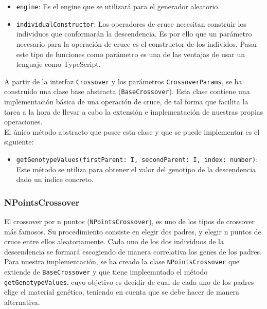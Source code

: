 \begin{itemize}
    \item \texttt{engine}: Es el engine que se utilizará para el generador aleatorio.
    \item \texttt{individualConstructor}: Los operadores de cruce necesitan construir los individuos que conformarán la descendencia. Es por ello que un parámetro necesario para la operación de cruce es el constructor de los individos. Pasar este tipo de funciones como parámetro es una de las ventajas de usar un lenguaje como TypeScript.
\end{itemize}

A partir de la interfaz \texttt{Crossover} y los parámetros \texttt{CrossoverParams}, se ha construido una clase base abstracta (\texttt{BaseCrossover}). Esta clase contiene una implementación básica de una operación de cruce, de tal forma que facilita la tarea a la hora de llevar a cabo la extensión e implementación de nuestras propias operaciones. \\

El único método abstracto que posee esta clase y que se puede implementar es el siguiente:

\begin{itemize}
    \item \texttt{getGenotypeValues(firstParent: I, secondParent: I, index: number)}: Este método se utiliza para obtener el valor del genotipo de la descendencia dado un índice concreto.
\end{itemize}

\subsubsection{NPointsCrossover}

El crossover por n puntos (\texttt{NPointsCrossover}), es uno de los tipos de crossover más famosos. Su procedimiento consiste en elegir dos padres, y elegir n puntos de cruce entre ellos aleatoriamente. Cada uno de los dos individuos de la descendencia se formará escogiendo de manera correlativa los genes de los padres. \\

Para nuestra implementación, se ha creado la clase \texttt{NPointsCrossover} que extiende de \texttt{BaseCrossover} y que tiene impleemntado el método \texttt{getGenotypeValues}, cuyo objetivo es decidir de cual de cada uno de los padres elige el material genético, teniendo en cuenta que se debe hacer de manera alternativa.

